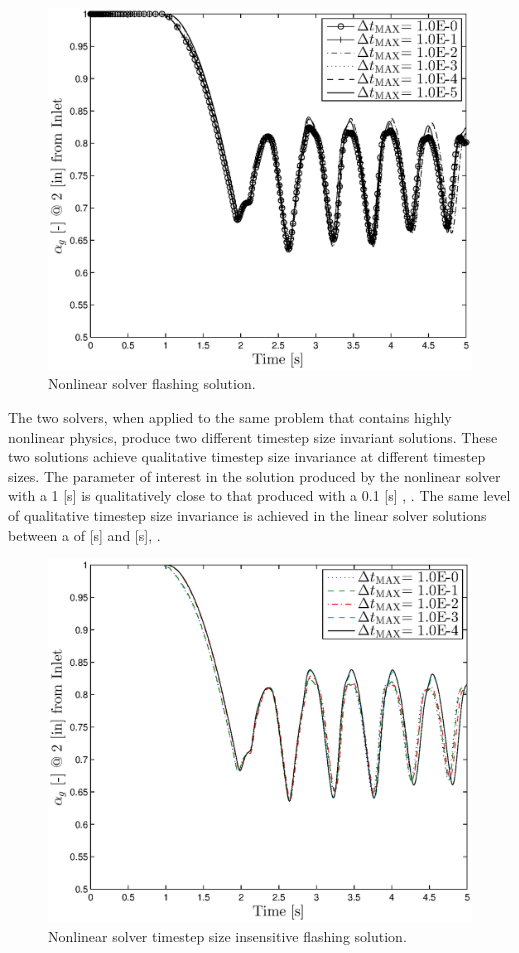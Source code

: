 \begin{figure}[h!bt]
\centering
\includegraphics[width=.6\textwidth]{plots/nln_flashing_al_2in.eps}
\caption{Nonlinear solver flashing solution.}
\label{fig:nl_mode_flashing}
\end{figure}

The two solvers, when applied to the same problem that contains highly nonlinear physics, produce two different timestep size invariant solutions.
These two solutions achieve qualitative timestep size invariance at different timestep sizes.
The parameter of interest in the solution produced by the nonlinear solver with a 1 [s] \dtmax{} is qualitatively close to that produced with a 0.1 [s] \dtmax{}, .
The same level of qualitative timestep size invariance is achieved in the linear solver solutions between a \dtmax{} of  [s] and  [s], .

\begin{figure}[h!bt]
\centering
\includegraphics[width=.6\textwidth]{plots/nln_flashing_1em0_1em1.eps}
\caption{Nonlinear solver timestep size insensitive flashing solution.}
\label{fig:nl_flashing_compare}
\end{figure}

